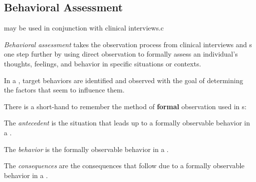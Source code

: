 \subsection{Behavioral Assessment}\label{subsec:Behavioral_Assessment}
 may be used in conjunction with clinical interviews.c

\begin{definition}\label{def:Behavioral_Assessment}
  \emph{Behavioral assessment} takes the observation process from clinical interviews and s one step further by using direct observation to formally assess an individual's thoughts, feelings, and behavior in specific situations or contexts.
\end{definition}

In a , target behaviors are identified and observed with the goal of determining the factors that seem to influence them.

There is a short-hand to remember the method of \textbf{formal} observation used in s:
\begin{description}[noitemsep]
\item[A] 
\item[B] 
\item[C] 
\end{description}

\begin{definition}[Antecedent]\label{def:Antecedent}
  The \emph{antecedent} is the situation that leads up to a formally observable behavior in a .
\end{definition}

\begin{definition}[Behavior]\label{def:Behavior}
  The \emph{behavior} is the formally observable behavior in a .
\end{definition}

\begin{definition}[Consequences]\label{def:Consequences}
  The \emph{consequences} are the consequences that follow due to a formally observable behavior in a .
\end{definition}

